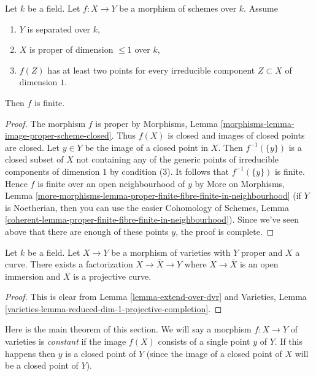 \begin{lemma}
\label{lemma-finite}
Let $k$ be a field. Let $f : X \to Y$ be a morphism of
schemes over $k$. Assume
\begin{enumerate}
\item $Y$ is separated over $k$,
\item $X$ is proper of dimension $\leq 1$ over $k$,
\item $f(Z)$ has at least two points for every irreducible
component $Z \subset X$ of dimension $1$.
\end{enumerate}
Then $f$ is finite.
\end{lemma}

\begin{proof}
The morphism $f$ is proper by
Morphisms, Lemma \ref{morphisms-lemma-image-proper-scheme-closed}.
Thus $f(X)$ is closed and images of closed points are closed.
Let $y \in Y$ be the image of a closed point in $X$.
Then $f^{-1}(\{y\})$ is a closed subset of $X$ not
containing any of the generic points of irreducible components
of dimension $1$ by condition (3). It follows that $f^{-1}(\{y\})$
is finite. Hence $f$ is finite over an open neighbourhood of $y$
by
More on Morphisms, Lemma
\ref{more-morphisms-lemma-proper-finite-fibre-finite-in-neighbourhood}
(if $Y$ is Noetherian, then you can use the easier
Cohomology of Schemes, Lemma
\ref{coherent-lemma-proper-finite-fibre-finite-in-neighbourhood}).
Since we've seen above that there are enough of these points
$y$, the proof is complete.
\end{proof}

\begin{lemma}
\label{lemma-extend-to-completion}
Let $k$ be a field. Let $X \to Y$ be a morphism of varieties
with $Y$ proper and $X$ a curve.
There exists a factorization $X \to \overline{X} \to Y$
where $X \to \overline{X}$ is an open immersion
and $\overline{X}$ is a projective curve.
\end{lemma}

\begin{proof}
This is clear from Lemma \ref{lemma-extend-over-dvr}
and Varieties, Lemma \ref{varieties-lemma-reduced-dim-1-projective-completion}.
\end{proof}

\noindent
Here is the main theorem of this section. We will say a morphism
$f : X \to Y$ of varieties is {\it constant} if the image $f(X)$
consists of a single point $y$ of $Y$. If this happens then
$y$ is a closed point of $Y$ (since the image of a closed point
of $X$ will be a closed point of $Y$).

